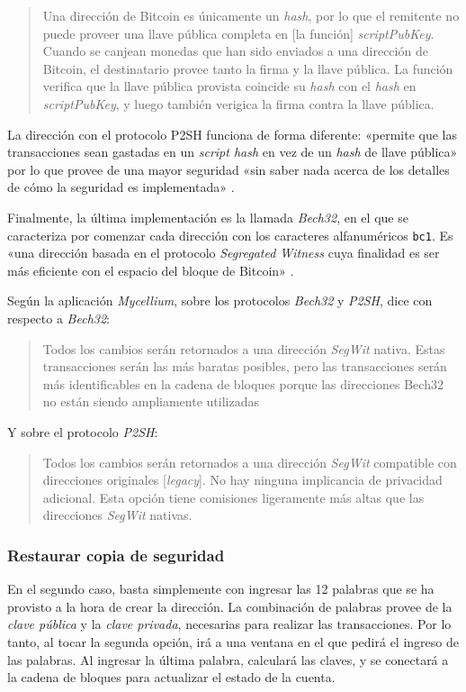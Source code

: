 \documentclass[12pt,a4paper,twoside]{book}
\begin{document}
\begin{quotation}
Una dirección de Bitcoin es únicamente un \textit{hash}, por lo que el remitente no puede proveer una llave pública completa en [la función] \textit{scriptPubKey}. Cuando se canjean monedas que han sido enviados a una dirección de Bitcoin, el destinatario provee tanto la firma y la llave pública. La función verifica que la llave pública provista coincide su \textit{hash} con el \textit{hash} en \textit{scriptPubKey}, y luego también verigica la firma contra la llave pública. \cite{bitwiki:p2pkh}
\end{quotation}

La dirección con el protocolo P2SH funciona de forma diferente: «permite que las transacciones sean gastadas en un \textit{script hash} en vez de un \textit{hash} de llave pública» por lo que provee de una mayor seguridad «sin saber nada acerca de los detalles de cómo la seguridad es implementada» \cite{bitwiki:p2sh}.

Finalmente, la última implementación es la llamada \textit{Bech32}, en el que se caracteriza por comenzar cada dirección con los caracteres alfanuméricos \texttt{bc1}. Es «una dirección basada en el protocolo \textit{Segregated Witness} cuya finalidad es ser más eficiente con el espacio del bloque de Bitcoin» \cite{bitwiki:bech32}.

Según la aplicación \textit{Mycellium}, sobre los protocolos \textit{Bech32} y \textit{P2SH}, dice con respecto a \textit{Bech32}:

\begin{quotation}
Todos los cambios serán retornados a una dirección \textit{SegWit} nativa. Estas transacciones serán las más baratas posibles, pero las transacciones serán más identificables en la cadena de bloques porque las direcciones Bech32 no están siendo ampliamente utilizadas
\end{quotation}

Y sobre el protocolo \textit{P2SH}:

\begin{quotation}
Todos los cambios serán retornados a una dirección \textit{SegWit} compatible con direcciones originales [\textit{legacy}]. No hay ninguna implicancia de privacidad adicional. Esta opción tiene comisiones ligeramente más altas que las direcciones \textit{SegWit} nativas.
\end{quotation}

\subsubsection{Restaurar copia de seguridad}
En el segundo caso, basta simplemente con ingresar las 12 palabras que se ha provisto a la hora de crear la dirección. La combinación de palabras provee de la \textit{clave pública} y la \textit{clave privada}, necesarias para realizar las transacciones. Por lo tanto, al tocar la segunda opción, irá a una ventana en el que pedirá el ingreso de las palabras. Al ingresar la última palabra, calculará las claves, y se conectará a la cadena de bloques para actualizar el estado de la cuenta.
\end{document}
